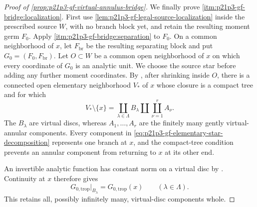 \begin{proof}[Proof of
\cref{prop:p21p3-gf-virtual-annulus-bridge}]
We finally prove \cref{itm:p21p3-gf-bridge:localization}.  First use
\cref{lem:p21p3-gf-legal-source-localization} inside the prescribed source
\(W\), with no branch block yet, and retain the resulting moment germ
\(F_0\).  Apply
\cref{itm:p21p3-gf-bridge:separation} to \(F_0\).  On a common neighborhood
of \(x\), let \(F_{\mathrm{br}}\) be the resulting separating block and put
\(G_0=(F_0,F_{\mathrm{br}})\).  Let \(O\subset W\) be a common open
neighborhood of \(x\) on which every coordinate of \(G_0\) is an analytic
unit.  We choose the source star before adding any further moment coordinates.
By \cite[Theorem~4.5.4]{Ducros24CurveStructure}, after shrinking inside
\(O\), there is a connected open elementary neighborhood \(V_*\) of \(x\)
whose closure is a compact tree and for which
\begin{equation}
 V_*\setminus\{x\}
   =\coprod_{\lambda\in\Lambda}B_\lambda
      \amalg\coprod_{\nu=1}^{r}A_\nu .
 \label{eq:p21p3-gf-elementary-star-decomposition}
\end{equation}
The \(B_\lambda\) are virtual discs, whereas
\(A_1,\ldots,A_r\) are the finitely many gently virtual-annular components.
Every component in \eqref{eq:p21p3-gf-elementary-star-decomposition}
represents one branch at \(x\), and the compact-tree condition prevents an
annular component from returning to \(x\) at its other end.

An invertible analytic function has constant norm on a virtual disc by
\cite[\S3.6.32.3]{Ducros24CurveStructure}.  Continuity at \(x\) therefore
gives
\begin{equation}
 G_{0,\mathrm{trop}}|_{B_\lambda}
       =G_{0,\mathrm{trop}}(x)
       \qquad(\lambda\in\Lambda).
 \label{eq:p21p3-gf-disc-components-at-vertex}
\end{equation}
This retains all, possibly infinitely many, virtual-disc components whole.


\end{proof}
